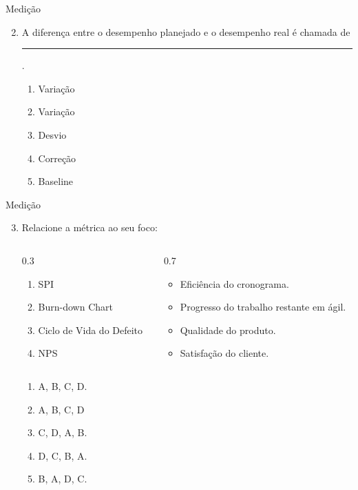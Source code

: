 \documentclass{beamer}
\begin{document}
\begin{frame}{Medição}
	\begin{enumerate}
		\setcounter{enumi}{1}
		\justifying
		\item A diferença entre o desempenho planejado e o desempenho real é chamada de \rule{60pt}{1pt}.
		\begin{enumerate}[a]
			\item Variação
			\item \alert<2>{Variação}
			\item Desvio
			\item Correção
			\item Baseline
		\end{enumerate}
	\end{enumerate}
\end{frame}

\begin{frame}{Medição}
	\begin{enumerate}
		\setcounter{enumi}{2}
		\justifying
		\item Relacione a métrica ao seu foco:
		\begin{columns}
			\begin{column}{0.3\textwidth}
				\begin{enumerate}[A]
					\item SPI
					\item Burn-down Chart
					\item Ciclo de Vida do Defeito
					\item NPS
				\end{enumerate}
			\end{column}
			\begin{column}{0.7\textwidth}
				\begin{itemize}
					\item Eficiência do cronograma.
					\item Progresso do trabalho restante em ágil.
					\item Qualidade do produto.
					\item Satisfação do cliente.
				\end{itemize}
			\end{column}
		\end{columns}
		\begin{enumerate}[a]
			\item A, B, C, D.
			\item \alert<2>{A, B, C, D}
			\item C, D, A, B.
			\item D, C, B, A.
			\item B, A, D, C.
		\end{enumerate}
	\end{enumerate}
\end{frame}
\end{document}
